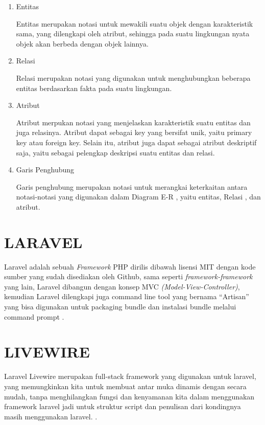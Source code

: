 \begin{enumerate}
	\item Entitas
	\par Entitas merupakan notasi untuk mewakili suatu objek dengan karakteristik sama, yang dilengkapi oleh atribut, sehingga pada suatu lingkungan nyata objek akan berbeda dengan objek lainnya.
	\item Relasi
	\par Relasi merupakan notasi yang digunakan untuk menghubungkan beberapa entitas berdasarkan fakta pada suatu lingkungan.
	\item Atribut
	\par Atribut merpukan notasi yang menjelaskan karakteristik suatu entitas dan juga relasinya. Atribut dapat sebagai key yang bersifat unik, yaitu primary key atau foreign key. Selain itu, atribut juga dapat sebagai atribut deskriptif saja, yaitu sebagai pelengkap deskripsi suatu entitas dan relasi.	
	\item Garis Penghubung
	\par Garis penghubung merupakan notasi untuk merangkai keterkaitan antara notasi-notasi yang digunakan dalam Diagram E-R , yaitu entitas, Relasi , dan atribut.
\end{enumerate}

\section{\uppercase{Laravel}}
\par Laravel adalah sebuah \textit{Framework} PHP dirilis dibawah lisensi MIT dengan kode sumber yang sudah disediakan oleh Github, sama seperti \textit{framework-framework} yang lain, Laravel dibangun dengan konsep MVC \textit{(Model-View-Controller)}, kemudian Laravel dilengkapi juga command line tool yang bernama “Artisan” yang bisa digunakan untuk packaging bundle dan instalasi bundle melalui command prompt \citep{aminudin2015}.

\section{\uppercase{Livewire}}
Laravel Livewire merupakan full-stack framework yang digunakan untuk laravel, yang memungkinkan kita untuk membuat antar muka dinamis dengan secara mudah, tanpa menghilangkan fungsi dan kenyamanan kita dalam menggunakan framework laravel jadi untuk struktur script dan penulisan dari kondingnya masih menggunakan laravel. \citep{dumetschool2021}.

